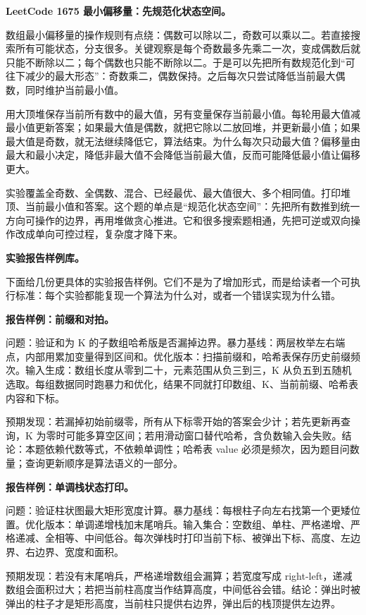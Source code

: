 \noindent\textbf{LeetCode 1675 最小偏移量：先规范化状态空间。}

数组最小偏移量的操作规则有点绕：偶数可以除以二，奇数可以乘以二。若直接搜索所有可能状态，分支很多。关键观察是每个奇数最多先乘二一次，变成偶数后就只能不断除以二；每个偶数也只能不断除以二。于是可以先把所有数规范化到“可往下减少的最大形态”：奇数乘二，偶数保持。之后每次只尝试降低当前最大偶数，同时维护当前最小值。

用大顶堆保存当前所有数中的最大值，另有变量保存当前最小值。每轮用最大值减最小值更新答案；如果最大值是偶数，就把它除以二放回堆，并更新最小值；如果最大值是奇数，就无法继续降低它，算法结束。为什么每次只动最大值？偏移量由最大和最小决定，降低非最大值不会降低当前最大值，反而可能降低最小值让偏移更大。

实验覆盖全奇数、全偶数、混合、已经最优、最大值很大、多个相同值。打印堆顶、当前最小值和答案。这个题的单点是“规范化状态空间”：先把所有数推到统一方向可操作的边界，再用堆做贪心推进。它和很多搜索题相通，先把可逆或双向操作改成单向可控过程，复杂度才降下来。

\noindent\textbf{实验报告样例库。}

下面给几份更具体的实验报告样例。它们不是为了增加形式，而是给读者一个可执行标准：每个实验都能复现一个算法为什么对，或者一个错误实现为什么错。

\noindent\textbf{报告样例：前缀和对拍。}

问题：验证和为 K 的子数组哈希版是否漏掉边界。暴力基线：两层枚举左右端点，内部用累加变量得到区间和。优化版本：扫描前缀和，哈希表保存历史前缀频次。输入生成：数组长度从零到二十，元素范围从负三到三，K 从负五到五随机选取。每组数据同时跑暴力和优化，结果不同就打印数组、K、当前前缀、哈希表内容和下标。

预期发现：若漏掉初始前缀零，所有从下标零开始的答案会少计；若先更新再查询，K 为零时可能多算空区间；若用滑动窗口替代哈希，含负数输入会失败。结论：本题依赖代数等式，不依赖单调性；哈希表 value 必须是频次，因为题目问数量；查询更新顺序是算法语义的一部分。

\noindent\textbf{报告样例：单调栈状态打印。}

问题：验证柱状图最大矩形宽度计算。暴力基线：每根柱子向左右找第一个更矮位置。优化版本：单调递增栈加末尾哨兵。输入集合：空数组、单柱、严格递增、严格递减、全相等、中间低谷。每次弹栈时打印当前下标、被弹出下标、高度、左边界、右边界、宽度和面积。

预期发现：若没有末尾哨兵，严格递增数组会漏算；若宽度写成 right-left，递减数组会面积过大；若把当前柱高度当作结算高度，中间低谷会错。结论：弹出时被弹出的柱子才是矩形高度，当前柱只提供右边界，弹出后的栈顶提供左边界。

